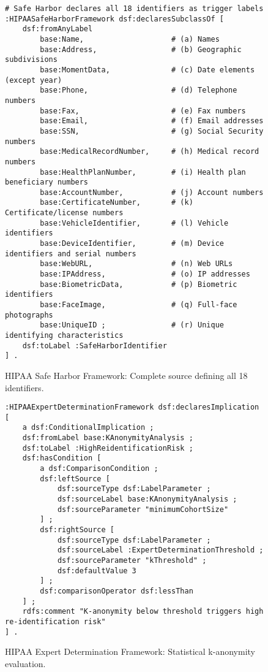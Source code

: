 \documentclass{IOS-Book-Article}
\begin{document}
\begin{figure}[ht]
\begin{lstlisting}[basicstyle=\ttfamily, frame=none]
# Safe Harbor declares all 18 identifiers as trigger labels
:HIPAASafeHarborFramework dsf:declaresSubclassOf [
    dsf:fromAnyLabel 
        base:Name,                    # (a) Names
        base:Address,                 # (b) Geographic subdivisions
        base:MomentData,              # (c) Date elements (except year)
        base:Phone,                   # (d) Telephone numbers
        base:Fax,                     # (e) Fax numbers
        base:Email,                   # (f) Email addresses
        base:SSN,                     # (g) Social Security numbers
        base:MedicalRecordNumber,     # (h) Medical record numbers
        base:HealthPlanNumber,        # (i) Health plan beneficiary numbers
        base:AccountNumber,           # (j) Account numbers
        base:CertificateNumber,       # (k) Certificate/license numbers
        base:VehicleIdentifier,       # (l) Vehicle identifiers
        base:DeviceIdentifier,        # (m) Device identifiers and serial numbers
        base:WebURL,                  # (n) Web URLs
        base:IPAddress,               # (o) IP addresses
        base:BiometricData,           # (p) Biometric identifiers
        base:FaceImage,               # (q) Full-face photographs
        base:UniqueID ;               # (r) Unique identifying characteristics
    dsf:toLabel :SafeHarborIdentifier
] .
\end{lstlisting}
\caption{HIPAA Safe Harbor Framework: Complete source defining all 18 identifiers.}
\label{fig:appendix-safe-harbor}
\end{figure}

\begin{figure}[ht]
\begin{lstlisting}[basicstyle=\ttfamily, frame=none]
:HIPAAExpertDeterminationFramework dsf:declaresImplication [
    a dsf:ConditionalImplication ;
    dsf:fromLabel base:KAnonymityAnalysis ;
    dsf:toLabel :HighReidentificationRisk ;
    dsf:hasCondition [
        a dsf:ComparisonCondition ;
        dsf:leftSource [
            dsf:sourceType dsf:LabelParameter ;
            dsf:sourceLabel base:KAnonymityAnalysis ;
            dsf:sourceParameter "minimumCohortSize"
        ] ;
        dsf:rightSource [
            dsf:sourceType dsf:LabelParameter ;
            dsf:sourceLabel :ExpertDeterminationThreshold ;
            dsf:sourceParameter "kThreshold" ;
            dsf:defaultValue 3
        ] ;
        dsf:comparisonOperator dsf:lessThan
    ] ;
    rdfs:comment "K-anonymity below threshold triggers high re-identification risk"
] .
\end{lstlisting}
\caption{HIPAA Expert Determination Framework: Statistical k-anonymity evaluation.}
\label{fig:appendix-expert-determination}
\end{figure}
\end{document}
